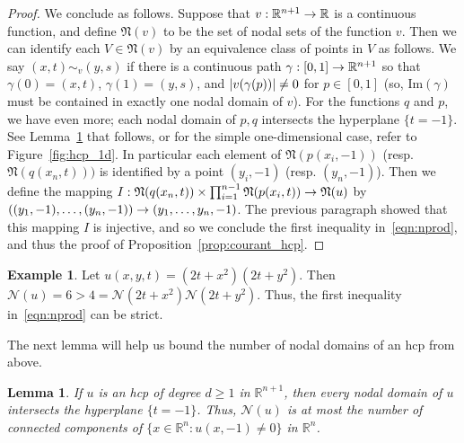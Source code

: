 \documentclass[10pt]{amsart}
\newtheorem{lemm}[theo]{Lemma}\newtheorem{prop}[theo]{Proposition}\newtheorem{coro}[theo]{Corollary}\newtheorem{conj}[theo]{Conjecture}
\theoremstyle{definition}\newtheorem{defi}[theo]{Definition}\newtheorem{rema}[theo]{Remark}\newtheorem{exam}[theo]{Example}\newtheorem{exem}[theo]{Example}\newtheorem{nota}[theo]{Notation}
\newcommand{\R}{\mathbb{R}}
\newcommand{\ra}{\to}
\newcommand{\abs}[1]{\left \lvert #1 \right \rvert}
\renewcommand{\Im}{\mathrm{Im}}
\newcommand{\fkN}{\mathfrak{N}}
\newcommand{\nodal}{\mathcal{N}}
\renewcommand*{\to}{\mathchoice{\longrightarrow}{\rightarrow}{\rightarrow}{\rightarrow}}
\let\originalleft\left
\let\originalright\right
\renewcommand{\left}{\mathopen{}\mathclose\bgroup\originalleft}
\renewcommand{\right}{\aftergroup\egroup\originalright}
\begin{document}
\begin{proof}
{We conclude as follows. Suppose that $v:\R^{n+1} \ra \R$ is a continuous function, and define $\fkN(v)$ to be the set of nodal sets of the function $v$. Then we can identify each $V \in \fkN(v)$ by an equivalence class of points in $V$ as follows. We say $(x,t) \sim_v (y,s)$ if there is a continuous path $\gamma:[0,1] \ra \R^{n+1}$ so that $\gamma(0) = (x,t)$, $\gamma(1) = (y,s)$, and $\abs{v(\gamma(p))} \ne 0$ for $p \in [0,1]$ (so, $\Im(\gamma)$ must be contained in exactly one nodal domain of $v$). For the functions $q$ and $p$, we have even more; each nodal domain of $p, q$ intersects the hyperplane $\{t = -1\}$. See Lemma~\ref{negative-times} that follows, or for the simple one-dimensional case, refer to Figure~\ref{fig:hcp_1d}. In particular each element of $\fkN(p(x_i, -1))$ (resp. $\fkN(q(x_n, t)))$ is identified by a point $(y_i, -1)$ (resp. $(y_n, -1)$). Then we define the mapping $I: \fkN(q(x_n,t)) \times \prod_{i=1}^{n-1} \fkN(p(x_i, t)) \ra \fkN(u)$ by $((y_1, -1), \dots, (y_n, -1)) \ra (y_1, \dots, y_n, -1)$. The previous paragraph showed that this mapping $I$ is injective, and so we conclude the first inequality in~\eqref{eqn:nprod}, and thus the proof of Proposition~\ref{prop:courant_hcp}.}
\end{proof}

\begin{exam}
Let $u(x,y,t)=(2t+x^2)(2t+y^2)$. Then $\nodal(u)=6>4=\nodal(2t+x^2)\nodal(2t+y^2)$. Thus, the first inequality in~\eqref{eqn:nprod} can be strict.
\end{exam}

The next lemma will help us bound the number of nodal domains of an hcp from above.

\begin{lemm}\label{negative-times}
If $u$ is an hcp of degree $d\geq 1$ in $\R^{n+1}$, then every nodal domain of $u$ intersects the hyperplane $\{t=-1\}$. Thus, $\nodal(u)$ is at most the number of connected components of $\{x\in\R^n:u(x,-1)\neq 0\}$ in $\R^n$.
\end{lemm}
\end{document}
